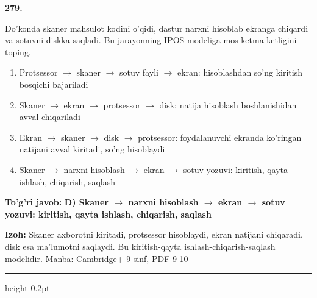\documentclass[10pt,a4paper]{article}
\begin{document}
{\bfseries\sffamily\color{ink} 279.}
\par
Do'konda skaner mahsulot kodini o'qidi, dastur narxni hisoblab ekranga chiqardi va sotuvni diskka saqladi. Bu jarayonning IPOS modeliga mos ketma-ketligini toping.
\begin{enumerate}[label=\Alph*),leftmargin=9mm]
\item Protsessor \ensuremath{\rightarrow} skaner \ensuremath{\rightarrow} sotuv fayli \ensuremath{\rightarrow} ekran: hisoblashdan so'ng kiritish bosqichi bajariladi
\item Skaner \ensuremath{\rightarrow} ekran \ensuremath{\rightarrow} protsessor \ensuremath{\rightarrow} disk: natija hisoblash boshlanishidan avval chiqariladi
\item Ekran \ensuremath{\rightarrow} skaner \ensuremath{\rightarrow} disk \ensuremath{\rightarrow} protsessor: foydalanuvchi ekranda ko'ringan natijani avval kiritadi, so'ng hisoblaydi
\item Skaner \ensuremath{\rightarrow} narxni hisoblash \ensuremath{\rightarrow} ekran \ensuremath{\rightarrow} sotuv yozuvi: kiritish, qayta ishlash, chiqarish, saqlash
\end{enumerate}
\begin{tcolorbox}[enhanced,breakable,colback=teal!4,colframe=teal!60!black,boxrule=0.45pt,arc=1.2mm,left=2.7mm,right=2.7mm,top=1.8mm,bottom=1.8mm,before skip=2mm,after skip=2mm]
{\bfseries\sffamily\color{teal}To'g'ri javob:} \textbf{D) Skaner \ensuremath{\rightarrow} narxni hisoblash \ensuremath{\rightarrow} ekran \ensuremath{\rightarrow} sotuv yozuvi: kiritish, qayta ishlash, chiqarish, saqlash}
\par\smallskip
{\bfseries Izoh:} Skaner axborotni kiritadi, protsessor hisoblaydi, ekran natijani chiqaradi, disk esa ma'lumotni saqlaydi. Bu kiritish-qayta ishlash-chiqarish-saqlash modelidir. Manba: Cambridge+ 9-sinf, PDF 9-10
\end{tcolorbox}
\vspace{2mm}\hrule height 0.2pt\vspace{3mm}
\end{document}
